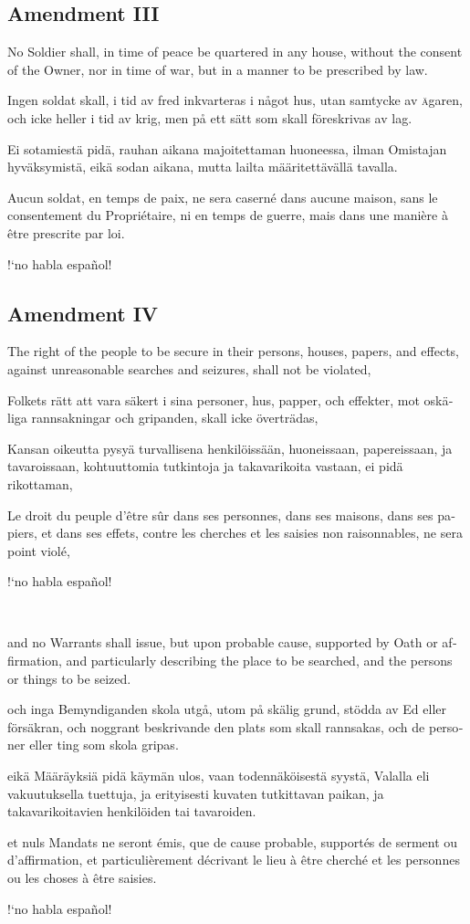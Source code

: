 \documentclass[a4paper,landscape,10pt]{article}
\newcommand{\tblock}[5]{\noindent\begin{minipage}[t]{0.18\textwidth}\foreignlanguage{english}{#1}\end{minipage}\hskip 0.025\textwidth\begin{minipage}[t]{0.18\textwidth}\foreignlanguage{swedish}{#2}\end{minipage}\hskip 0.025\textwidth\begin{minipage}[t]{0.18\textwidth}\foreignlanguage{finnish}{#3}\end{minipage}\hskip 0.025\textwidth\begin{minipage}[t]{0.18\textwidth}\foreignlanguage{french}{#4}\end{minipage}\hskip 0.025\textwidth\begin{minipage}[t]{0.18\textwidth}\foreignlanguage{spanish}{#5}\end{minipage}}
\begin{document}
\subsection*{Amendment III}
\tblock
{No Soldier shall, in time of peace be quartered in any house, without the consent of the Owner, nor in time of war, but in a manner to be prescribed by law.}
{Ingen soldat skall, i tid av fred inkvarteras i något hus, utan samtycke av \textsc{ä}garen, och icke heller i tid av krig, men på ett sätt som skall föreskrivas av lag.}
{Ei sotamiestä pidä, rauhan aikana majoitettaman huoneessa, ilman Omistajan hyväksymistä, eikä sodan aikana, mutta lailta määritettävällä tavalla.}
{Aucun soldat, en temps de paix, ne sera caserné dans aucune maison, sans le consentement du Propriétaire, ni en temps de guerre, mais dans une manière à être prescrite par loi.}
{!`no habla español!}

\subsection*{Amendment IV}
\tblock
{The right of the people to be secure in their persons, houses, papers, and effects, against unreasonable searches and seizures, shall not be violated,}
{Folkets rätt att vara säkert i sina personer, hus, papper, och effekter, mot oskäliga rannsakningar och gripanden, skall icke överträdas,}
{Kansan oikeutta pysyä turvallisena henkilöissään, huoneissaan, papereissaan, ja tavaroissaan, kohtuuttomia tutkintoja ja takavarikoita vastaan, ei pidä rikottaman,}
{Le droit du peuple d'être sûr dans ses personnes, dans ses maisons, dans ses papiers, et dans ses effets, contre les cherches et les saisies non raisonnables, ne sera point violé,}
{!`no habla español!}

~

\tblock
{and no Warrants shall issue, but upon probable cause, supported by Oath or affirmation, and particularly describing the place to be searched, and the persons or things to be seized.}
{och inga Bemyndiganden skola utgå, utom på skälig grund, stödda av Ed eller försäkran, och noggrant beskrivande den plats som skall rannsakas, och de personer eller ting som skola gripas.}
{eikä Määräyksiä pidä käymän ulos, vaan todennäköisestä syystä, Valalla eli vakuutuksella tuettuja, ja erityisesti kuvaten tutkittavan paikan, ja takavarikoitavien henkilöiden tai tavaroiden.}
{et nuls Mandats ne seront émis, que de cause probable, supportés de serment ou d'affirmation, et particulièrement décrivant le lieu à être cherché et les personnes ou les choses à être saisies.}
{!`no habla español!}
\end{document}
